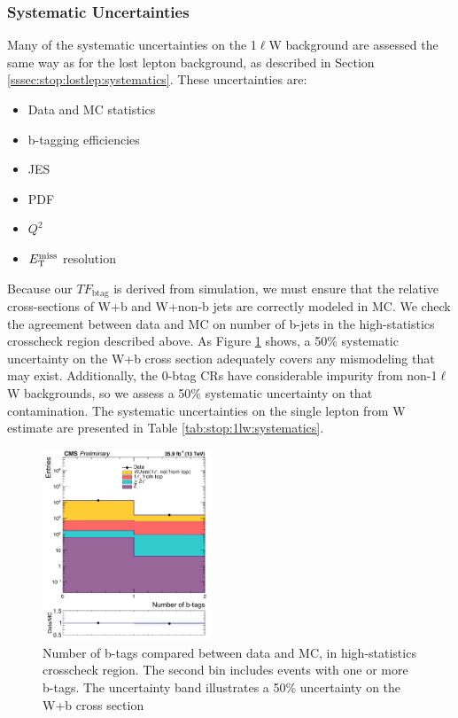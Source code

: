 \subsubsection{Systematic Uncertainties}
\label{sssec:stop:1lw:systematics}

Many of the systematic uncertainties on the 1$\ell$W background are
assessed the same way as for the lost lepton background, as described
in Section \ref{sssec:stop:lostlep:systematics}. These uncertainties
are:
\begin{itemize}
\item Data and MC statistics
\item b-tagging efficiencies
\item JES
\item PDF
\item $Q^2$
\item $E_\text{T}^\text{miss}$ resolution
\end{itemize}

Because our $TF_\text{btag}$ is derived from simulation, we must ensure that
the relative cross-sections of W+b and W+non-b jets are correctly
modeled in MC. We check the agreement between data and MC on number of
b-jets in the high-statistics crosscheck region described above. As
Figure \ref{fig:stop:1lw:wb} shows, a 50\% systematic uncertainty on
the W+b cross section adequately covers any mismodeling that may
exist. Additionally, the 0-btag CRs have considerable impurity from
non-1$\ell$W backgrounds, so we assess a 50\% systematic uncertainty on
that contamination. The systematic uncertainties on the single lepton
from W estimate are presented in Table \ref{tab:stop:1lw:systematics}.

\begin{figure}[htb]
\centering
\includegraphics[width=0.45\textwidth]{figures/cr0b_nbtags_crosscheck.pdf}
\caption{Number of b-tags compared between data and MC, in
  high-statistics crosscheck region. The second bin includes events
  with one or more b-tags. The uncertainty band illustrates a 50\%
  uncertainty on the W+b cross section}
\label{fig:stop:1lw:wb}
\end{figure}

